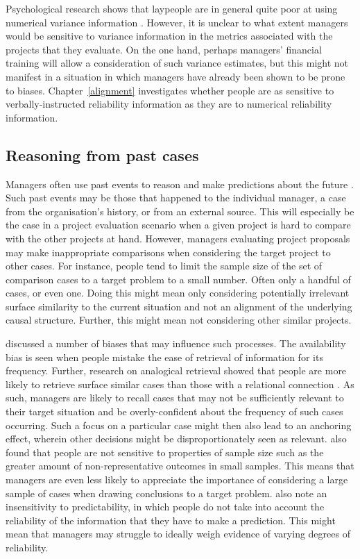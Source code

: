 \documentclass[a4paper, nobind, dvipsnames]{templates/ociamthesis}
\theoremstyle{definition}
\theoremstyle{definition}
\theoremstyle{definition}
\theoremstyle{definition}
\theoremstyle{remark}
\begin{document}
Psychological research shows that laypeople are in general quite poor at using
numerical variance information \autocite{galesic2010,konold1993,vivalt2018,batteux2020}. However, it is unclear to what extent managers would be sensitive
to variance information in the metrics associated with the projects that they
evaluate. On the one hand, perhaps managers' financial training will allow a
consideration of such variance estimates, but this might not manifest in a
situation in which managers have already been shown to be prone to biases.
Chapter~\ref{alignment} investigates whether people are as sensitive to
verbally-instructed reliability information as they are to numerical reliability
information.

\subsection{Reasoning from past cases}

Managers often use past events to reason and make predictions about the future
\autocite{einhorn1987}. Such past events may be those that happened to the individual
manager, a case from the organisation's history, or from an external source.
This will especially be the case in a project evaluation scenario when a given
project is hard to compare with the other projects at hand. However, managers
evaluating project proposals may make inappropriate comparisons when considering
the target project to other cases. For instance, people tend to limit the sample
size of the set of comparison cases to a target problem to a small number. Often
only a handful of cases, or even one. Doing this might mean only considering
potentially irrelevant surface similarity to the current situation and not an
alignment of the underlying causal structure. Further, this might mean not
considering other similar projects.

\textcite{tversky1974} discussed a number of biases that may influence such processes. The
availability bias is seen when people mistake the ease of retrieval of
information for its frequency. Further, research on analogical retrieval showed
that people are more likely to retrieve surface similar cases than those with a
relational connection \autocite{gentner1993}. As such, managers are likely to recall
cases that may not be sufficiently relevant to their target situation and be
overly-confident about the frequency of such cases occurring. Such a focus on a
particular case might then also lead to an anchoring effect, wherein other
decisions might be disproportionately seen as relevant. \textcite{tversky1974} also found
that people are not sensitive to properties of sample size such as the greater
amount of non-representative outcomes in small samples. This means that managers
are even less likely to appreciate the importance of considering a large sample
of cases when drawing conclusions to a target problem. \textcite{tversky1974} also note an
insensitivity to predictability, in which people do not take into account the
reliability of the information that they have to make a prediction. This might
mean that managers may struggle to ideally weigh evidence of varying degrees of
reliability.
\end{document}
